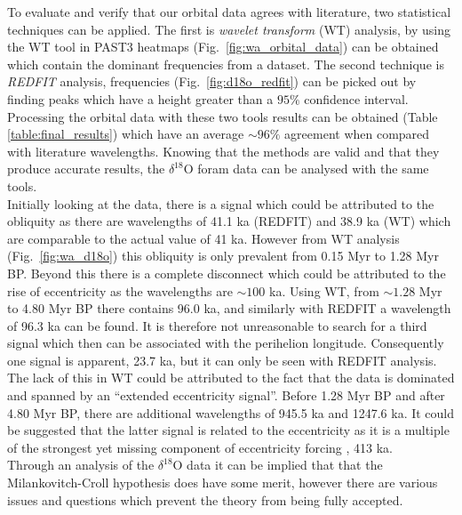 \documentclass[12pt, onecolumn]{revtex4}    %
\begin{document}
To evaluate and verify that our orbital data agrees with literature, two statistical techniques can be applied. The first is \textit{wavelet transform} (WT) analysis, by using the WT tool in PAST3 \cite{past3} heatmaps (Fig.~\ref{fig:wa_orbital_data}) can be obtained which contain the dominant frequencies from a dataset. The second technique is \textit{REDFIT} analysis, frequencies (Fig.~\ref{fig:d18o_redfit}) can be picked out by finding peaks which have a height greater than a $95\%$ confidence interval. Processing the orbital data with these two tools results can be obtained (Table \ref{table:final_results}) which have an average $\sim 96 \%$ agreement when compared with literature wavelengths. Knowing that the methods are valid and that they produce accurate results, the $\delta^{18}$O foram data can be analysed with the same tools. \\


Initially looking at the data, there is a signal which could be attributed to the obliquity as there are wavelengths of 41.1 ka (REDFIT) and 38.9 ka (WT) which are comparable to the actual value of 41 ka. However from WT analysis (Fig.~\ref{fig:wa_d18o}) this obliquity is only prevalent from 0.15 Myr to 1.28 Myr BP. Beyond this there is a complete disconnect which could be attributed to the rise of eccentricity as the wavelengths are $\sim 100$ ka. Using WT, from $\sim 1.28$ Myr to 4.80 Myr BP there contains 96.0 ka, and similarly with REDFIT a wavelength of 96.3 ka can be found.  It is therefore not unreasonable to search for a third signal which then can be associated with the perihelion longitude. Consequently one signal is apparent, 23.7 ka, but it can only be seen with REDFIT analysis. The lack of this in WT could be attributed to the fact that the data is dominated and spanned by an ``extended eccentricity signal''. Before 1.28 Myr BP and after 4.80 Myr BP, there are additional wavelengths of 945.5 ka and 1247.6 ka. It could be suggested that the latter signal is related to the eccentricity as it is a multiple of the strongest yet missing component of eccentricity forcing \cite{berger_climate}, 413 ka. \\

Through an analysis of the $\delta^{18}$O data it can be implied that that the Milankovitch-Croll hypothesis does have some merit, however there are various issues and questions which prevent the theory from being fully accepted. \\
\end{document}
